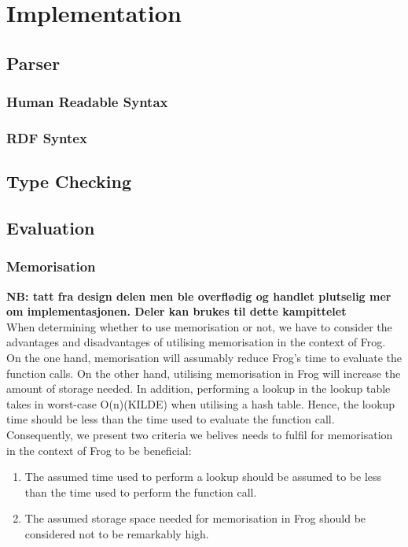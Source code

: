 
\chapter{Implementation}

\section{Parser}
\subsection{Human Readable Syntax}
\label{implHRS}
\subsection{RDF Syntex}
\label{implRDF}

\section{Type Checking}

\section{Evaluation}
\label{implementation_evaluation}

\subsection{Memorisation}
\textbf{NB: tatt fra design delen men ble overflødig og handlet plutselig mer om implementasjonen. Deler kan brukes til dette kampittelet}
\\
When determining whether to use memorisation or not, we have to consider the advantages and disadvantages of utilising memorisation in the context of Frog. On the one hand, memorisation will assumably reduce Frog's time to evaluate the function calls. On the other hand, utilising memorisation in Frog will increase the amount of storage needed. In addition, performing a lookup in the lookup table takes in worst-case O(n)(KILDE) when utilising a hash table. Hence, the lookup time should be less than the time used to evaluate the function call. Consequently, we present two criteria we belives needs to fulfil for memorisation in the context of Frog to be beneficial:
\begin{enumerate}
    \item The assumed time used to perform a lookup should be assumed to be less than the time used to perform the function call.
    \item The assumed storage space needed for memorisation in Frog should be considered not to be remarkably high. 
\end{enumerate}

